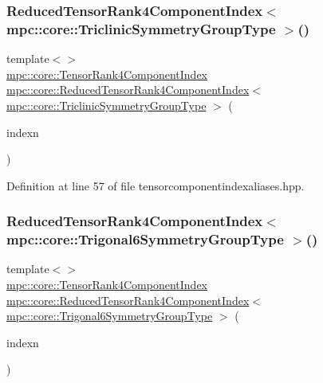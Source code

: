 \subsubsection{\texorpdfstring{Reduced\+Tensor\+Rank4\+Component\+Index$<$ mpc\+::core\+::\+Triclinic\+Symmetry\+Group\+Type $>$()}{ReducedTensorRank4ComponentIndex< mpc::core::TriclinicSymmetryGroupType >()}}
{\footnotesize\ttfamily template$<$$>$ \\
\mbox{\hyperlink{namespacempc_1_1core_a54c081f41b2475abd10182bf023805d2}{mpc\+::core\+::\+Tensor\+Rank4\+Component\+Index}} \mbox{\hyperlink{namespacempc_1_1core_ae67b259d682419c12fa2e072049d20ad}{mpc\+::core\+::\+Reduced\+Tensor\+Rank4\+Component\+Index}}$<$ \mbox{\hyperlink{structmpc_1_1core_1_1_triclinic_symmetry_group_type}{mpc\+::core\+::\+Triclinic\+Symmetry\+Group\+Type}} $>$ (\begin{DoxyParamCaption}\item[{const \mbox{\hyperlink{namespacempc_1_1core_a54c081f41b2475abd10182bf023805d2}{mpc\+::core\+::\+Tensor\+Rank4\+Component\+Index}} \&}]{indexn }\end{DoxyParamCaption})\hspace{0.3cm}{\ttfamily [inline]}}



Definition at line 57 of file tensorcomponentindexaliases.\+hpp.

\mbox{\label{namespacempc_1_1core_ad1ff1df316ea57d13729b92536925713}} 
\subsubsection{\texorpdfstring{Reduced\+Tensor\+Rank4\+Component\+Index$<$ mpc\+::core\+::\+Trigonal6\+Symmetry\+Group\+Type $>$()}{ReducedTensorRank4ComponentIndex< mpc::core::Trigonal6SymmetryGroupType >()}}
{\footnotesize\ttfamily template$<$$>$ \\
\mbox{\hyperlink{namespacempc_1_1core_a54c081f41b2475abd10182bf023805d2}{mpc\+::core\+::\+Tensor\+Rank4\+Component\+Index}} \mbox{\hyperlink{namespacempc_1_1core_ae67b259d682419c12fa2e072049d20ad}{mpc\+::core\+::\+Reduced\+Tensor\+Rank4\+Component\+Index}}$<$ \mbox{\hyperlink{structmpc_1_1core_1_1_trigonal6_symmetry_group_type}{mpc\+::core\+::\+Trigonal6\+Symmetry\+Group\+Type}} $>$ (\begin{DoxyParamCaption}\item[{const \mbox{\hyperlink{namespacempc_1_1core_a54c081f41b2475abd10182bf023805d2}{mpc\+::core\+::\+Tensor\+Rank4\+Component\+Index}} \&}]{indexn }\end{DoxyParamCaption})\hspace{0.3cm}{\ttfamily [inline]}}



